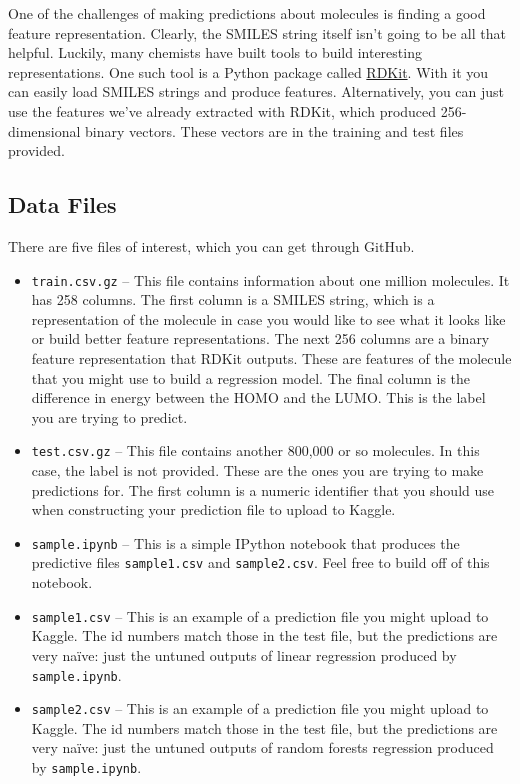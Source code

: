 \documentclass[12pt]{article}
\begin{document}
	One of the challenges of making predictions about molecules is finding a good feature representation.  Clearly, the SMILES string itself isn't going to be all that helpful.  Luckily, many chemists have built tools to build interesting representations.  One such tool is a Python package called \href{http://www.rdkit.org/}{RDKit}.  With it you can easily load SMILES strings and produce features. Alternatively, you can just use the features we've already extracted with RDKit, which produced 256-dimensional binary vectors.  These vectors are in the training and test files provided.
	
	\subsection*{Data Files}
	There are five files of interest, which you can get through GitHub.
	\begin{itemize}
		\item \verb|train.csv.gz| -- This file contains information about one million molecules.  It has 258 columns.  The first column is a SMILES string, which is a representation of the molecule in case you would like to see what it looks like or build better feature representations. The next 256 columns are a binary feature representation that RDKit outputs.  These are features of the molecule that you might use to build a regression model.  The final column is the difference in energy between the HOMO and the LUMO.  This is the label you are trying to predict.
		\item \verb|test.csv.gz| -- This file contains another 800,000 or so molecules.  In this case, the label is not provided.  These are the ones you are trying to make predictions for. The first column is a numeric identifier that you should use when constructing your prediction file to upload to Kaggle.
		\item \verb|sample.ipynb| -- This is a simple IPython notebook that produces the predictive files \verb|sample1.csv| and \verb|sample2.csv|.  Feel free to build off of this notebook.
		\item \verb|sample1.csv| -- This is an example of a prediction file you might upload to Kaggle.  The id numbers match those in the test file, but the predictions are very na\"ive: just the untuned outputs of linear regression produced by \verb|sample.ipynb|.
		\item \verb|sample2.csv| -- This is an example of a prediction file you might upload to Kaggle.  The id numbers match those in the test file, but the predictions are very na\"ive: just the untuned outputs of random forests regression produced by \verb|sample.ipynb|.
	\end{itemize}
	
\end{document}
